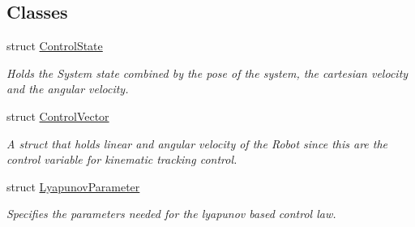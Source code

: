 \subsection*{Classes}
\begin{DoxyCompactItemize}
\item 
struct \hyperlink{structController_1_1ControlState}{Control\+State}
\begin{DoxyCompactList}\small\item\em Holds the System state combined by the pose of the system, the cartesian velocity and the angular velocity. \end{DoxyCompactList}\item 
struct \hyperlink{structController_1_1ControlVector}{Control\+Vector}
\begin{DoxyCompactList}\small\item\em A struct that holds linear and angular velocity of the Robot since this are the control variable for kinematic tracking control. \end{DoxyCompactList}\item 
struct \hyperlink{structController_1_1LyapunovParameter}{Lyapunov\+Parameter}
\begin{DoxyCompactList}\small\item\em Specifies the parameters needed for the lyapunov based control law. \end{DoxyCompactList}\end{DoxyCompactItemize}
